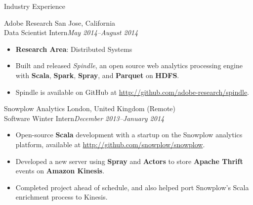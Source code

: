 \documentclass[letter]{article}
\begin{document}
\begin{minipage}{\textwidth}
{\huge Industry Experience }


  
    {\large Adobe Research } \hfill San Jose, California \\
    Data Scientist Intern\hfill {\it May 2014--August 2014}\begin{itemize}
      
        \item {\bf Research Area}: Distributed Systems
      
        \item Built and released {\it Spindle}, an open source web analytics processing engine with {\bf Scala}, {\bf Spark}, {\bf Spray}, and {\bf Parquet} on {\bf HDFS}.
      
        \item Spindle is available on GitHub at \url{http://github.com/adobe-research/spindle}.
      
      \end{itemize}\end{minipage}
    \begin{minipage}{\textwidth}
    \bigskip
  
    {\large Snowplow Analytics } \hfill London, United Kingdom (Remote) \\
    Software Winter Intern\hfill {\it December 2013--January 2014}\begin{itemize}
      
        \item Open-source {\bf Scala} development with a startup on the Snowplow analytics platform, available at \url{http://github.com/snowplow/snowplow}.
      
        \item Developed a new server using {\bf Spray} and {\bf Actors} to store {\bf Apache Thrift} events on {\bf Amazon Kinesis}.
      
        \item Completed project ahead of schedule, and also helped port Snowplow's Scala enrichment process to Kinesis.
      
      \end{itemize}\end{minipage}
\end{document}
